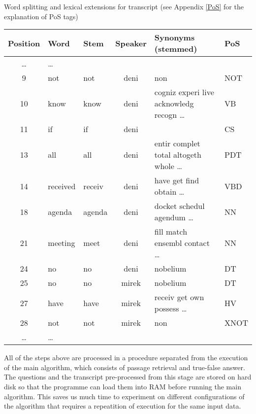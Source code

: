 \begin{center}
\begin{threeparttable}
\scriptsize
\caption{Word splitting and lexical extensions for transcript (see Appendix \ref{PoS} for the explanation of PoS tags)}
\label{word_splitting_transcript}
\begin{tabular}{|c|l|l|c|l|l|}
\hline  \bf{Position} & \bf{Word} & \bf{Stem} & \bf{Speaker} & \bf{Synonyms (stemmed)} &\bf{PoS} \\
\hline \ldots & \ldots & & & &\\
\hline 9 & not & not & deni & non & NOT\\
\hline 10 & know & know & deni & cogniz experi live acknowledg recogn \ldots & VB\\
\hline 11 & if & if & deni & & CS\\
\hline 13 & all & all & deni & entir complet total altogeth whole  \ldots & PDT\\
\hline 14 & received & receiv & deni & have get find obtain \ldots &VBD\\
\hline 18 & agenda & agenda & deni & docket schedul agendum \ldots & NN\\
\hline 21 & meeting & meet & deni & fill match ensembl contact \ldots & NN\\
\hline 24 & no & no & deni & nobelium & DT\\
\hline 25 & no & no & mirek & nobelium & DT\\
\hline 27 & have &have &mirek &  receiv get own possess \ldots &HV\\
\hline 28 & not &not &mirek & non&XNOT\\
\hline \ldots & \ldots & & & &\\
\hline 
\end{tabular}
\end{threeparttable}
\end{center}


\normalsize

All of the steps above are processed in a procedure separated from the execution of the main algorithm, which consists of passage retrieval and true-false answer. The questions and the transcript pre-processed from this stage are stored on hard disk so that the programme can load them into RAM before running the main algorithm. This saves us much time to experiment on different configurations of the algorithm that requires a repeatition of execution for the same input data. 

